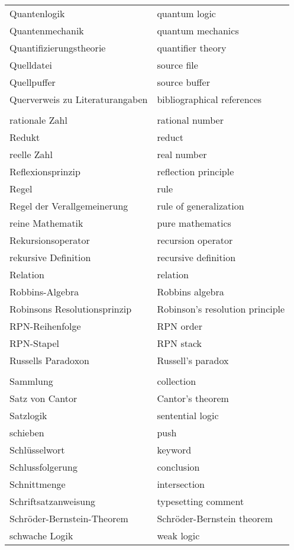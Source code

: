 \begin{longtabu}   { @{} X[l] X[l] }
    Quantenlogik & quantum logic \\
    Quantenmechanik & quantum mechanics \\
    Quantifizierungstheorie & quantifier theory \\
    Quelldatei & source file \\
    Quellpuffer & source buffer \\
    Querverweis zu Literaturangaben & bibliographical references \\
     & \\
    rationale Zahl & rational number \\
    Redukt & reduct \\
    reelle Zahl & real number \\
    Reflexionsprinzip & reflection principle \\
    Regel & rule \\
    Regel der Verallgemeinerung & rule of generalization \\
    reine Mathematik & pure mathematics \\
    Rekursionsoperator & recursion operator \\
    rekursive Definition & recursive definition \\
    Relation & relation \\
    Robbins-Algebra & Robbins algebra \\
    Robinsons Resolutionsprinzip & Robinson's resolution principle \\
    RPN-Reihenfolge & RPN order \\
    RPN-Stapel & RPN stack \\
    Russells Paradoxon & Russell's paradox \\
     & \\
    Sammlung & collection \\
    Satz von Cantor & Cantor's theorem \\
    Satzlogik & sentential logic \\
    schieben & push \\
    Schlüsselwort & keyword \\
    Schlussfolgerung  & conclusion \\
    Schnittmenge & intersection \\
    Schriftsatzanweisung & typesetting comment \\
    Schröder-Bernstein-Theorem & Schröder-Bernstein theorem \\
    schwache Logik & weak logic \\

\end{longtabu}
